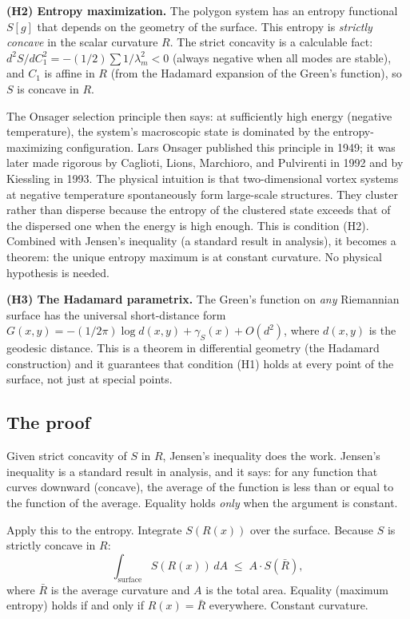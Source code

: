 \textbf{(H2) Entropy maximization.} The polygon system has an entropy
functional $S[g]$ that depends on the geometry of the surface. This
entropy is \emph{strictly concave} in the scalar curvature $R$. The
strict concavity is a calculable fact:
$d^2S/dC_1^2 = -(1/2)\sum 1/\lambda_m^2 < 0$
(always negative when all modes are stable), and $C_1$ is affine in $R$
(from the Hadamard expansion of the Green's function), so $S$ is
concave in $R$.

The Onsager selection principle then says: at sufficiently high
energy (negative temperature), the system's macroscopic state is
dominated by the entropy-maximizing configuration. Lars Onsager
published this principle in 1949; it was later made rigorous by
Caglioti, Lions, Marchioro, and Pulvirenti in 1992 and by Kiessling
in 1993. The physical intuition is that two-dimensional vortex
systems at negative temperature spontaneously form large-scale
structures. They cluster rather than disperse because
the entropy of the clustered state exceeds that of the dispersed
one when the energy is high enough. This is condition (H2).
Combined with Jensen's inequality (a standard result in analysis),
it becomes a theorem: the unique entropy maximum is at constant
curvature. No physical hypothesis is needed.

\textbf{(H3) The Hadamard parametrix.} The Green's function on
\emph{any} Riemannian surface has the universal short-distance form
$G(x, y) = -(1/2\pi)\log d(x, y) + \gamma_S(x) + O(d^2)$, where
$d(x, y)$ is the geodesic distance. This is a theorem in differential
geometry (the Hadamard construction) and it guarantees that condition
(H1) holds at every point of the surface, not just at special points.

\subsection*{The proof}

Given strict concavity of $S$ in $R$, Jensen's inequality does the
work. Jensen's inequality is a standard result in analysis, and it says:
for any function that curves downward (concave), the average of the
function is less than or equal to the function of the average. Equality
holds \emph{only} when the argument is constant.

Apply this to the entropy. Integrate $S(R(x))$ over the surface. Because
$S$ is strictly concave in $R$:
\[
  \int_{\text{surface}} S(R(x))\, dA
  \;\le\;
  A \cdot S(\bar{R}),
\]
where $\bar{R}$ is the average curvature and $A$ is the total area.
Equality (maximum entropy) holds if and only if $R(x) = \bar{R}$
everywhere. Constant curvature.

